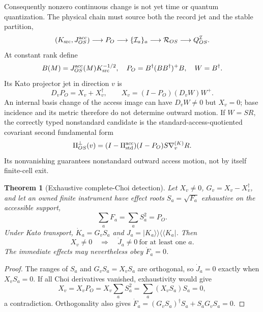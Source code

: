 \documentclass[11pt]{article}
\newtheorem{theorem}{Theorem}
\begin{document}
Consequently nonzero continuous change is not yet time or quantum
quantization.  The physical chain must source both the record jet and the
stable partition,
\begin{equation}
 (K_{\rm src},J_{OS}^{\rm acc})\longrightarrow P_O
 \longrightarrow\{\mathcal I_a\}_a
 \longrightarrow\mathcal R_{OS}\longrightarrow Q_{OS}^{\mathcal I}.
 \label{eq:instrument-quantizer-chain}
\end{equation}
At constant rank define
\begin{equation}
 B(M)=J_{OS}^{\rm acc}(M)K_{\rm src}^{-1/2},
 \quad
 P_O=B^\dagger(BB^\dagger)^+B,
 \quad W=B^\dagger.
 \label{eq:access-projector}
\end{equation}
Its Kato projector jet in direction $v$ is
\begin{equation}
 D_vP_O=X_v+X_v^\dagger,
 \qquad
 X_v=(I-P_O)(D_vW)W^+.
 \label{eq:kato-outward-jet}
\end{equation}
An internal basis change of the access image can have $D_vW\ne0$ but
$X_v=0$; base incidence and its metric therefore do not determine outward
motion.  If $W=SR$, the correctly typed nonstandard candidate is the
standard-access-quotiented covariant second fundamental form
\begin{equation}
 \mathrm{II}_{OS}^{\perp}(v)
 =(I-\Pi_{\rm std}^{\rm acc})(I-P_O)S\nabla_v^{(K)}R.
 \label{eq:observer-second-fundamental-form}
\end{equation}
Its nonvanishing guarantees nonstandard outward access motion, not by itself
finite-cell exit.

\begin{theorem}[Exhaustive complete-Choi detection]
\label{thm:exhaustive-choi-detection}
Let $X_v\ne0$, $G_v=X_v-X_v^\dagger$, and let an owned finite instrument have
effect roots $S_a=\sqrt{F_a}$ exhaustive on the accessible support,
\begin{equation}
 \sum_aF_a=\sum_aS_a^2=P_O.
 \label{eq:exhaustive-effects}
\end{equation}
Under Kato transport, $\dot K_a=G_vS_a$ and
$J_a=|K_a\rangle\!\rangle\langle\!\langle K_a|$.  Then
\begin{equation}
 X_v\ne0\quad\Longrightarrow\quad
 \dot J_a\ne0\ \text{for at least one }a.
 \label{eq:choi-detection}
\end{equation}
The immediate effects may nevertheless obey $\dot F_a=0$.
\end{theorem}

\begin{proof}
The ranges of $S_a$ and $G_vS_a=X_vS_a$ are orthogonal, so
$\dot J_a=0$ exactly when $X_vS_a=0$.  If all Choi derivatives vanished,
exhaustivity would give
\[
 X_v=X_vP_O=X_v\sum_aS_a^2
 =\sum_a(X_vS_a)S_a=0,
\]
a contradiction.  Orthogonality also gives
$\dot F_a=(G_vS_a)^\dagger S_a+S_aG_vS_a=0$.
\end{proof}
\end{document}
